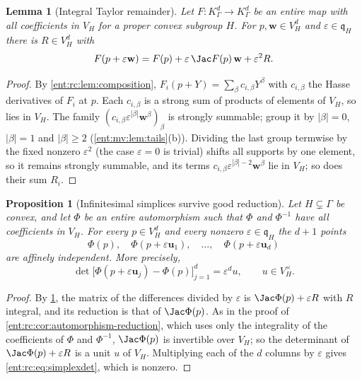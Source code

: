 \documentclass[11pt]{article}
\theoremstyle{plain}
\newtheorem{lemma}[lemma]{Lemma}
\theoremstyle{plain}
\newtheorem{proposition}[proposition]{Proposition}
\theoremstyle{plain}
\theoremstyle{definition}
\theoremstyle{definition}
\theoremstyle{definition}
\theoremstyle{definition}
\theoremstyle{remark}
\newcommand{\K}{K_\Gamma}\newcommand{\KD}{K_\Delta}
\begin{document}
\begin{lemma}[Integral Taylor remainder]\label{ent:rc:lem:taylor-remainder}
Let $F:\K^d\to\K^d$ be an entire map with all coefficients in $V_H$ for a
proper convex subgroup $H$. For $p,\mathbf w\in V_H^d$ and
$\varepsilon\in\mathfrak q_H$ there is $R\in V_H^d$ with
\begin{equation}\label{ent:rc:eq:taylor}
 F(p+\varepsilon\mathbf w)=F(p)+\varepsilon\,\Jac F(p)\,\mathbf w
 +\varepsilon^2R .
\end{equation}
\end{lemma}
\begin{proof}
By \cref{ent:rc:lem:composition}, $F_i(p+Y)=\sum_\beta c_{i,\beta}Y^\beta$ with
$c_{i,\beta}$ the Hasse derivatives of $F_i$ at $p$. Each $c_{i,\beta}$ is a
strong sum of products of elements of $V_H$, so lies in $V_H$. The family
$(c_{i,\beta}\varepsilon^{|\beta|}\mathbf w^\beta)_\beta$ is strongly summable;
group it by $|\beta|=0$, $|\beta|=1$ and $|\beta|\ge2$
(\cref{ent:mv:lem:tails}(b)). Dividing the last group termwise by the fixed
nonzero $\varepsilon^2$ (the case $\varepsilon=0$ is trivial) shifts all
supports by one element, so it remains strongly summable, and its terms
$c_{i,\beta}\varepsilon^{|\beta|-2}\mathbf w^\beta$ lie in $V_H$; so does their
sum $R_i$.
\end{proof}

\begin{proposition}[Infinitesimal simplices survive good reduction]
\label{ent:rc:prop:simplex}
Let $H\subsetneq\Gamma$ be convex, and let $\Phi$ be an entire automorphism
such that $\Phi$ and $\Phi^{-1}$ have all coefficients in $V_H$. For every
$p\in V_H^d$ and every nonzero $\varepsilon\in\mathfrak q_H$ the $d+1$ points
\[
 \Phi(p),\quad\Phi(p+\varepsilon\mathbf u_1),\quad\ldots,\quad
 \Phi(p+\varepsilon\mathbf u_d)
\]
are affinely independent. More precisely,
\begin{equation}\label{ent:rc:eq:simplexdet}
 \det\bigl[\Phi(p+\varepsilon\mathbf u_j)-\Phi(p)\bigr]_{j=1}^d
 =\varepsilon^du,\qquad u\in V_H^\times .
\end{equation}
\end{proposition}
\begin{proof}
By \cref{ent:rc:lem:taylor-remainder}, the matrix of the differences divided by
$\varepsilon$ is $\Jac\Phi(p)+\varepsilon R$ with $R$ integral, and its
reduction is that of $\Jac\Phi(p)$. As in the proof of
\cref{ent:rc:cor:automorphism-reduction}, which uses only the integrality of
the coefficients of $\Phi$ and $\Phi^{-1}$, $\Jac\Phi(p)$ is invertible over
$V_H$; so the determinant of $\Jac\Phi(p)+\varepsilon R$ is a unit $u$ of
$V_H$. Multiplying each of the $d$ columns by $\varepsilon$ gives
\eqref{ent:rc:eq:simplexdet}, which is nonzero.
\end{proof}
\end{document}
